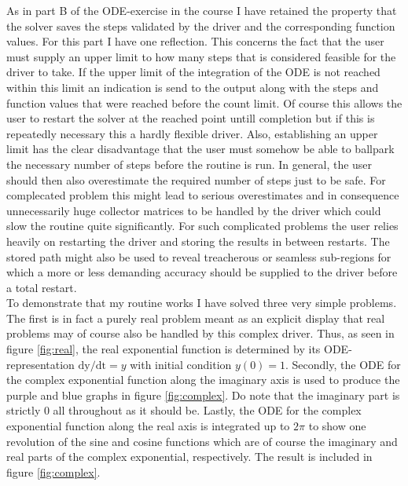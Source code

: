\documentclass[onecolumn]{article}
\begin{document}
As in part B of the ODE-exercise in the course I have retained the property that the solver saves the steps validated by the driver and the 
corresponding function values. For this part I have one reflection. This concerns the fact that the user must supply an upper limit to how many 
steps that is considered feasible for the driver to take. If the upper limit of the integration of the ODE is not reached within this limit 
an indication is send to the output along with the steps and function values that were reached before the count limit. Of course this allows 
the user to restart the solver at the reached point untill completion but if this is repeatedly necessary this a hardly flexible driver. 
Also, establishing an upper limit has the clear disadvantage that the user must somehow be able to ballpark the necessary number of steps 
before the routine is run. In general, the user should then also overestimate the required number of steps just to be safe. For complecated
problem this might lead to serious overestimates and in consequence unnecessarily huge collector matrices to be handled by the driver which
could slow the routine quite significantly. For such complicated problems the user relies heavily on restarting the driver and storing the 
results in between restarts. The stored path might also be used to reveal treacherous or seamless sub-regions for which a more or less demanding 
accuracy should be supplied to the driver before a total restart. \\

To demonstrate that my routine works I have solved three very simple problems. The first is in fact a purely real problem meant as an explicit 
display that real problems may of course also be handled by this complex driver. Thus, as seen in figure \ref{fig:real}, the real exponential 
function is determined by its ODE-representation $\mathrm{dy/dt} = y$ with initial condition $y(0)=1$.
Secondly, the ODE for the complex exponential function along the imaginary axis is used to produce the purple and blue graphs in figure 
\ref{fig:complex}. Do note that the imaginary part is strictly 0 all throughout as it should be.
Lastly, the ODE for the complex exponential function along the real axis is integrated up to $2\pi$ to show one revolution 
of the sine and cosine functions which are of course the imaginary and real parts of the complex exponential, respectively. The result is 
included in figure \ref{fig:complex}.
\end{document}
